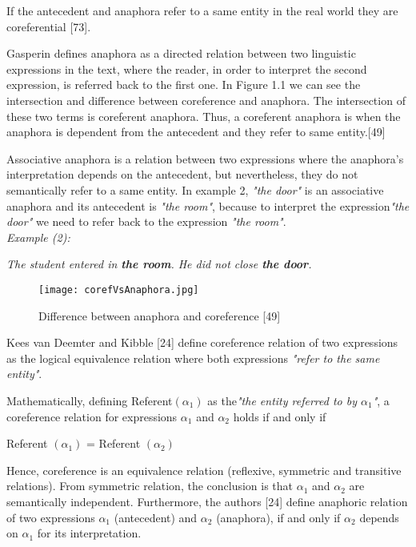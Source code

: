 If the antecedent and anaphora refer to a same entity in the real world they are coreferential [73].

Gasperin defines anaphora as a directed relation between two linguistic expressions in the text, where the reader, in order to interpret the second expression, is referred back to the first one. In Figure 1.1 we can see the intersection and difference between coreference and anaphora. The intersection of these two terms is coreferent anaphora. Thus, a coreferent anaphora is when the anaphora is dependent from the antecedent and they refer to same entity.[49]

Associative anaphora is a relation between two expressions where the anaphora's interpretation depends on the antecedent, but nevertheless, they do not semantically refer to a same entity. In example 2, \emph{"the door"} is an associative anaphora and its antecedent is \emph{"the room"}, because to interpret the expression\emph{"the door"} we need to refer back to the expression \emph{"the room"}.\\

\emph{Example (2):}
\begin{changemargin}{10mm}{10mm} 
   \emph{  The student entered in \textbf{the room}. He did not close \textbf{ the door}.}
   \vspace{5mm} 
\end{changemargin}  
\begin{figure}[ht]
   \begin{center}
	  \texttt{[image: corefVsAnaphora.jpg]} 
 	  \caption[Difference between anaphora and coreference]{Difference between anaphora and coreference [49]}
	  \label{Figure 1}
   \end{center}
\end{figure}

Kees van Deemter and Kibble [24] define coreference relation of two expressions as the logical equivalence relation where both expressions \emph{"refer to the same entity"}.
 
Mathematically, defining Referent$(\alpha_1)$ as the\emph{"the entity referred to by $\alpha_1$"}, a coreference relation for expressions $\alpha_1$ and $\alpha_2$ holds if and only if 
\begin{center}
  Referent $(\alpha_1)$ = Referent $(\alpha_2)$
\end{center}
 
Hence, coreference is an equivalence relation (reflexive, symmetric and transitive relations). From symmetric relation, the conclusion is that $\alpha_1$ and $\alpha_2$ are semantically independent. Furthermore, the authors [24] define anaphoric relation of two expressions $\alpha_1$ (antecedent) and $\alpha_2$ (anaphora), if and only if $\alpha_2$ depends on $\alpha_1$ for its interpretation. 
 

